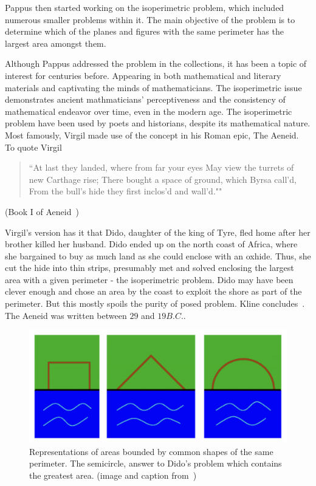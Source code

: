 \documentclass[a4paper]{book}
\begin{document}
Pappus then started working on the isoperimetric problem, which included numerous smaller problems within it. The main objective of the problem is to determine which of the planes and figures with the same perimeter has the largest area amongst them.

Although Pappus addressed the problem in the collections, it has been a topic of interest for centuries before. Appearing in both mathematical and literary materials and captivating the minds of mathematicians. 
\newline
\newline
The isoperimetric issue demonstrates ancient mathmaticians' perceptiveness and the consistency of mathematical endeavor over time, even in the modern age. The isoperimetric problem have been used by poets and historians, despite its mathematical nature. Most famously, Virgil made use of the concept in his Roman epic, The Aeneid. To quote Virgil
\begin{center}
    \begin{quote}
        ``At last they landed, where from far your eyes
        May view the turrets of new Carthage rise;
        There bought a space of ground, which Byrsa call'd,
        From the bull's hide they first inclos'd and wall'd.""
    \end{quote}
    (Book I of Aeneid~\cite{virgil1981aeneid})
\end{center}

Virgil's version has it that Dido, daughter of the king of Tyre, fled home after her brother killed her husband. Dido ended up on the north coast of Africa, where she bargained to buy as much land as she could enclose with an oxhide. Thus, she cut the hide into thin strips, presumably met and solved enclosing the largest area with a given perimeter - the isoperimetric problem. Dido may have been clever enough and chose an area by the coast to exploit the shore as part of the perimeter. But this mostly spoils the purity of posed problem. Kline concludes~\cite{kline1985mathematics}. The Aeneid was written between $29$ and $19 B.C.$.
\begin{figure}[h]
    \begin{center}   
        \includegraphics[width=120mm]{dido_1}
        \caption{Representations of areas bounded by common shapes of the same perimeter. The semicircle, answer to Dido's problem which contains the greatest area. (image and caption from~\cite{demjanenko2008isoperimetric})}
    \end{center}
\end{figure}
\leavevmode
\end{document}
